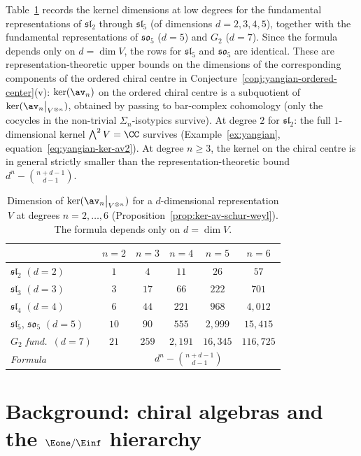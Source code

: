 \begin{remark}
\label{rem:ker-av-table}
Table~\ref{tab:ker-av-dims} records the kernel dimensions
at low degrees for the fundamental representations of
$\mathfrak{sl}_2$ through $\mathfrak{sl}_5$ (of dimensions
$d = 2, 3, 4, 5$), together with the fundamental
representations of $\mathfrak{so}_5$ ($d = 5$) and
$G_2$ ($d = 7$). Since the formula depends only on
$d = \dim V$, the rows for $\mathfrak{sl}_5$ and
$\mathfrak{so}_5$ are identical.
These are representation-theoretic upper bounds on the
dimensions of the corresponding components of the ordered
chiral centre in
Conjecture~\ref{conj:yangian-ordered-center}(v):
$\ker(\av_n)$ on the ordered chiral centre is a subquotient
of $\ker(\av_n\big|_{V^{\otimes n}})$, obtained by passing
to bar-complex cohomology
(only the cocycles in the non-trivial $\Sigma_n$-isotypics
survive). At degree $2$ for $\mathfrak{sl}_2$: the full
$1$-dimensional kernel $\bigwedge^2 V = \CC$ survives
(Example~\ref{ex:yangian},
equation~\eqref{eq:yangian-ker-av2}).
At degree $n \geq 3$, the kernel on the chiral centre is
in general strictly smaller than the
representation-theoretic bound $d^n - \binom{n+d-1}{d-1}$.

\begin{table}[h]
\centering
\renewcommand{\arraystretch}{1.3}
\begin{tabular}{@{} l c c c c c @{}}
\toprule
  & $n = 2$ & $n = 3$ & $n = 4$ & $n = 5$ & $n = 6$ \\
\midrule
$\mathfrak{sl}_2$ $(d{=}2)$
  & $1$ & $4$ & $11$ & $26$ & $57$ \\
$\mathfrak{sl}_3$ $(d{=}3)$
  & $3$ & $17$ & $66$ & $222$ & $701$ \\
$\mathfrak{sl}_4$ $(d{=}4)$
  & $6$ & $44$ & $221$ & $968$ & $4{,}012$ \\
$\mathfrak{sl}_5$, $\mathfrak{so}_5$ $(d{=}5)$
  & $10$ & $90$ & $555$ & $2{,}999$ & $15{,}415$ \\
$G_2$ \textit{fund.}\ $(d{=}7)$
  & $21$ & $259$ & $2{,}191$ & $16{,}345$ & $116{,}725$ \\
\midrule
\textit{Formula}
  & \multicolumn{5}{c}{$d^n - \binom{n+d-1}{d-1}$} \\
\bottomrule
\end{tabular}
\caption{Dimension of $\ker(\av_n\big|_{V^{\otimes n}})$
for a $d$-dimensional representation $V$ at degrees
$n = 2, \ldots, 6$
\textup{(Proposition~\ref{prop:ker-av-schur-weyl})}.
The formula depends only on $d = \dim V$.}
\label{tab:ker-av-dims}
\end{table}
\end{remark}


\section{Background: chiral algebras and the $\Eone/\Einf$
hierarchy}
\label{sec:background}
